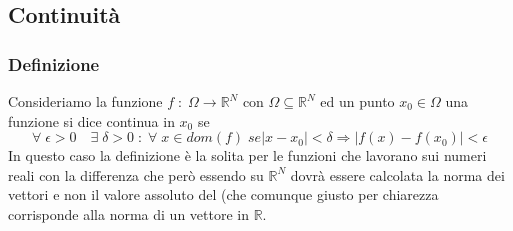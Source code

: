 \documentclass[fontsize = 20px, paper = a4]{article}
\begin{document}
\subsection{Continuità}
\subsubsection{Definizione}
Consideriamo la funzione $f \; : \; \Omega \rightarrow \mathbb{R}^N$ con $\Omega \subseteq \mathbb{R}^N$ ed un punto $x_0 \in \Omega$ una funzione si dice continua in $x_0$ se 
$$\forall \; \epsilon > 0 \quad \exists \; \delta > 0 \; : \; \forall \; x \in dom(f) \; se |x-x_0| < \delta \Rightarrow |f(x) - f(x_0)| < \epsilon$$
In questo caso la definizione è la solita per le funzioni che lavorano sui numeri reali con la differenza che però essendo su $\mathbb{R}^N$ dovrà essere calcolata la norma dei vettori e non il valore assoluto del (che comunque giusto per chiarezza corrisponde alla norma di un vettore in $\mathbb{R}$.
\end{document}
